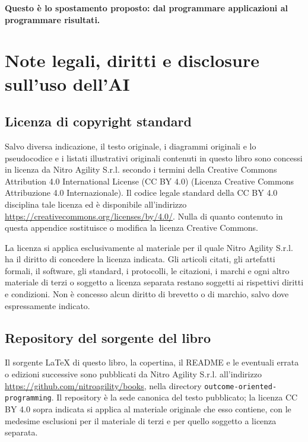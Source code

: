 \documentclass[10pt,oneside,openany]{book}
\newcommand{\mono}[1]{\texttt{#1}}
\begin{document}
\textbf{Questo è lo spostamento proposto: dal programmare applicazioni al programmare risultati.}

\appendix

\chapter{Note legali, diritti e disclosure sull'uso dell'AI}\label{app:legal}

\section{Licenza di copyright standard}
Salvo diversa indicazione, il testo originale, i diagrammi originali e lo pseudocodice e i listati illustrativi originali contenuti in questo libro sono concessi in licenza da Nitro Agility S.r.l. secondo i termini della Creative Commons Attribution 4.0 International License (CC BY 4.0) (Licenza Creative Commons Attribuzione 4.0 Internazionale). Il codice legale standard della CC BY 4.0 disciplina tale licenza ed è disponibile all'indirizzo \url{https://creativecommons.org/licenses/by/4.0/}. Nulla di quanto contenuto in questa appendice sostituisce o modifica la licenza Creative Commons.

La licenza si applica esclusivamente al materiale per il quale Nitro Agility S.r.l. ha il diritto di concedere la licenza indicata. Gli articoli citati, gli artefatti formali, il software, gli standard, i protocolli, le citazioni, i marchi e ogni altro materiale di terzi o soggetto a licenza separata restano soggetti ai rispettivi diritti e condizioni. Non è concesso alcun diritto di brevetto o di marchio, salvo dove espressamente indicato.

\section{Repository del sorgente del libro}
Il sorgente LaTeX di questo libro, la copertina, il README e le eventuali errata o edizioni successive sono pubblicati da Nitro Agility S.r.l. all'indirizzo \url{https://github.com/nitroagility/books}, nella directory \mono{outcome-oriented-programming}. Il repository è la sede canonica del testo pubblicato; la licenza CC BY 4.0 sopra indicata si applica al materiale originale che esso contiene, con le medesime esclusioni per il materiale di terzi e per quello soggetto a licenza separata.
\end{document}
